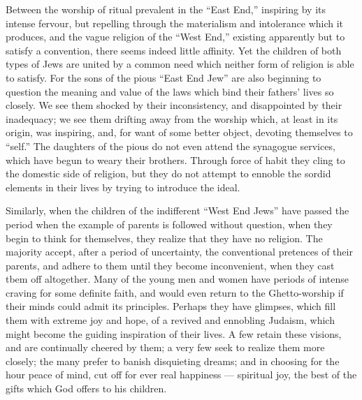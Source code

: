 Between the worship of ritual prevalent in the ``East 
End,'' inspiring by its intense fervour, but repelling 
through the materialism and intolerance which it produces, 
and the vague religion of the ``West End,'' existing apparently but to satisfy a convention, there seems indeed little 
affinity. Yet the children of both types of Jews are united 
by a common need which neither form of religion is able to 
satisfy. For the sons of the pious ``East End Jew'' are also 
beginning to question the meaning and value of the laws 
which bind their fathers' lives so closely. We see them 
shocked by their inconsistency, and disappointed by their 
inadequacy; we see them drifting away from the worship 
which, at least in its origin, was inspiring, and, for want of 
some better object, devoting themselves to ``self.'' The 
daughters of the pious do not even attend the synagogue 
services, which have begun to weary their brothers. Through 
force of habit they cling to the domestic side of religion, but 
they do not attempt to ennoble the sordid elements in their 
lives by trying to introduce the ideal. 

Similarly, when the children of the indifferent ``West 
End Jews'' have passed the period when the example 
of parents is followed without question, when they begin 
to think for themselves, they realize that they have no 
religion. The majority accept, after a period of uncertainty, the conventional pretences of their parents, and 
adhere to them until they become inconvenient, when they 
cast tbem off altogether. Many of the young men and 
women have periods of intense craving for some definite 
faith, and would even return to the Ghetto-worship if 
their minds could admit its principles. Perhaps they have 
glimpses, which fill them with extreme joy and hope, of 
a revived and ennobling Judaism, which might become the 
guiding inspiration of their lives. A few retain these 
visions, and are continually cheered by them; a very few 
seek to realize them more closely; the many prefer to 
banish disquieting dreams; and in choosing for the 
hour peace of mind, cut off for ever real happiness — 
spiritual joy, the best of the gifts which God offers to his 
children. 

